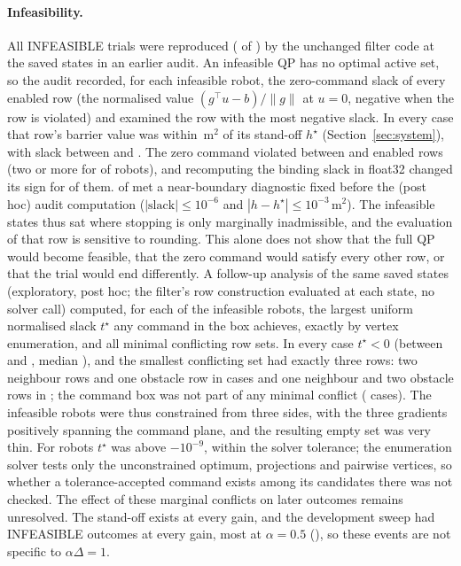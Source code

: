 \documentclass[11pt]{article}
\begin{document}
\paragraph{Infeasibility.} All \InfTotal{} INFEASIBLE trials were reproduced (\InfRepro{} of
\InfTotal) by the unchanged filter code at the saved states in an earlier audit. An infeasible QP
has no optimal active set, so the audit recorded, for each infeasible robot, the zero-command slack of
every enabled row (the normalised value $(g^\top u-b)/\|g\|$ at $u=0$, negative when the row is
violated) and examined the row with the most negative slack. In every case that row's barrier value was
within \InfHdiffMax{}\,m$^2$ of its stand-off $h^\star$ (Section~\ref{sec:system}), with slack between
\InfSlackMin{} and \InfSlackMax. The zero command violated between \InfRowsMin{} and \InfRowsMax{}
enabled rows (two or more for \InfRowsTwoPlus{} of \InfRobots{} robots), and recomputing the binding
slack in float32 changed its sign for \InfFlipFthirtytwo{} of them. \InfNear{} of \InfRobots{} met a
near-boundary diagnostic fixed before the (post hoc) audit computation ($|\text{slack}|\le10^{-6}$ and
$|h-h^\star|\le10^{-3}$\,m$^2$). The infeasible states thus sat where stopping is only marginally
inadmissible, and the evaluation of that row is sensitive to rounding. This alone does not show that the full
QP would become feasible, that the zero command would satisfy every other row, or that the trial would
end differently. A follow-up analysis of the same saved states (exploratory, post hoc; the filter's row
construction evaluated at each state, no solver call) computed, for each of the \ConfRobots{} infeasible
robots, the largest uniform normalised slack $t^\star$ any command in the box achieves, exactly by
vertex enumeration, and all minimal conflicting row sets. In every case $t^\star<0$ (between
\ConfTstarMin{} and \ConfTstarMax, median \ConfTstarMed), and the smallest conflicting set had exactly
three rows: two neighbour rows and one obstacle row in \ConfNNO{} cases and one neighbour and two
obstacle rows in \ConfNOO; the command box was not part of any minimal conflict (\ConfBoxNeeded{}
cases). The infeasible robots were thus constrained from three sides, with the three gradients
positively spanning the command plane, and the resulting empty set was very thin. For \ConfWithinTol{}
robots $t^\star$ was above $-10^{-9}$, within the solver tolerance; the enumeration solver tests only the
unconstrained optimum, projections and pairwise vertices, so whether a tolerance-accepted command exists
among its candidates there was not checked. The effect of these marginal conflicts on later outcomes
remains unresolved. The stand-off exists
at every gain, and the development sweep had INFEASIBLE outcomes at every gain, most at $\alpha=0.5$
(\SelInfhalf), so these events are not specific to $\alpha\Delta=1$.
\end{document}
